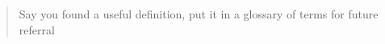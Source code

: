 \begin{framed}
\begin{quotation}
Say you found a useful definition, put it in a glossary of terms for future referral \cite{riboch}
\end{quotation}
\end{framed}
